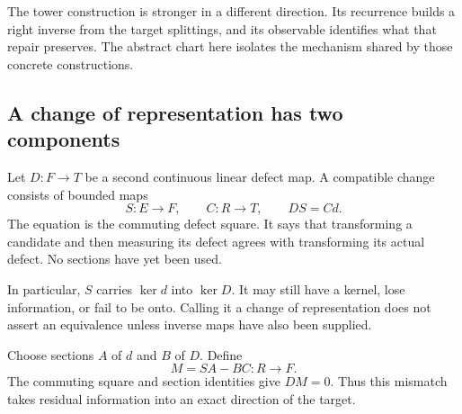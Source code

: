 The tower construction is stronger in a different direction. Its recurrence builds a right inverse from the target splittings, and its observable identifies what that repair preserves. The abstract chart here isolates the mechanism shared by those concrete constructions.

\subsection{A change of representation has two components}
Let \(D:F\to T\) be a second continuous linear defect map. A compatible change consists of bounded maps
\[
 S:E\to F,\qquad C:R\to T,\qquad DS=Cd.
\]
The equation is the commuting defect square. It says that transforming a candidate and then measuring its defect agrees with transforming its actual defect. No sections have yet been used.

In particular, \(S\) carries \(\ker d\) into \(\ker D\). It may still have a kernel, lose information, or fail to be onto. Calling it a change of representation does not assert an equivalence unless inverse maps have also been supplied.

Choose sections \(A\) of \(d\) and \(B\) of \(D\). Define
\begin{equation}\label{eq:repair-mismatch}
 M=SA-BC:R\longrightarrow F.
\end{equation}
The commuting square and section identities give \(DM=0\). Thus this mismatch takes residual information into an exact direction of the target.


